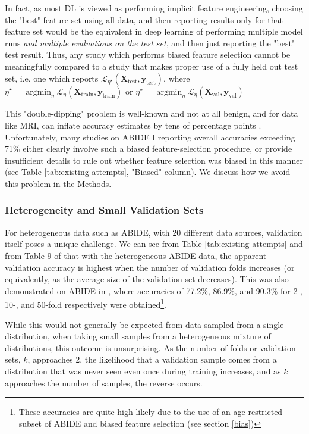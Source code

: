 \documentclass[10pt]{article}
\newcommand{\tsub}[2]{\mathbf{#1}_{\text{#2}}}
\DeclareMathOperator*{\argmin}{\arg\min}
\begin{document}
In fact, as most DL is viewed as performing implicit feature engineering, choosing the "best"
feature set using all data, and then reporting results only for that feature set would be the
equivalent in deep learning of performing multiple model runs \emph{and multiple evaluations on the
test set}, and then just reporting the "best" test result. Thus, any study which performs biased
feature selection cannot be meaningfully compared to a study that makes proper use of a fully held
out test set, i.e. one which reports \(\mathcal{L}_{\eta^{\star}}(\tsub{X}{test}, \tsub{y}{test})\),
where \(\eta^{\star} = \argmin_{\eta}  \mathcal{L}_{\eta}(\tsub{X}{train}, \tsub{y}{train})\) or
\(\eta^{\star} = \argmin_{\eta} \mathcal{L}_{\eta}(\tsub{X}{val}, \tsub{y}{val}) \)

This "double-dipping" \citep{kriegeskorteCircularAnalysisSystems2009} problem is well-known and not
at all benign, and for data like MRI, can inflate accuracy estimates by tens of percentage points
\citep{wen:hal-02105134}. Unfortunately, many studies on ABIDE I reporting overall accuracies
exceeding 71\% either clearly involve such a biased feature-selection procedure, or provide
insufficient details to rule out whether feature selection was biased in this manner (see
\hyperref[tab:existing-attempts]{Table \ref{tab:existing-attempts}},  "Biased" column). We discuss
how we avoid this problem in the \hyperref[sec:methods]{Methods}.


\subsubsection{Heterogeneity and Small Validation Sets}

For heterogeneous data such as ABIDE, with 20 different data sources, validation itself poses a
unique challenge. We can see from Table \ref{tab:existing-attempts} and from Table 9 of
\citet{sakaiMachineLearningStudies2019} that with the heterogeneous ABIDE data, the apparent
validation accuracy is highest when the number of validation folds increases (or equivalently, as
the average size of the validation set decreases). This was also demonstrated on ABIDE in
\citet{iidakaRestingStateFunctional2015}, where accuracies of 77.2\%, 86.9\%, and 90.3\% for 2-, 10-,
and 50-fold respectively were obtained\footnote{These accuracies are quite high likely due to the use of an
age-restricted subset of ABIDE and biased feature selection (see section \ref{bias})}.

While this would not generally be expected from data sampled from a single
distribution, when taking small samples from a heterogeneous mixture of distributions, this outcome
is unsurprising. As the number of folds or validation sets, \(k\), approaches \(2\), the likelihood that a validation sample comes from a distribution that
was never seen even once during training increases, and as \(k\) approaches the number of samples, the reverse
occurs.
\end{document}
